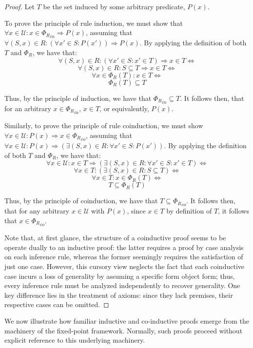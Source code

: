 \begin{proof}
Let $T$ be the set induced by some arbitrary predicate, $P(x)$.

To prove the principle of rule induction, we must show that $\forall x \in \mathcal{U}: x \in {\Phi_R}_{in} \Rightarrow P(x)$, assuming that $\forall (S,x) \in R: (\forall x' \in S: P(x')) \Rightarrow P(x)$. By applying the definition of both $T$ and $\Phi_R$, we have that:
$$ \forall (S,x) \in R: (\forall x' \in S: x' \in T) \Rightarrow x \in T  \iff$$
$$ \forall (S,x) \in R: S \subseteq T \Rightarrow x \in T \iff$$
$$ \forall x \in \Phi_R(T): x \in T \iff$$
$$ \Phi_R(T) \subseteq T$$

Thus, by the principle of induction, we have that ${\Phi_R}_{in} \subseteq T$. It follows then, that for an arbitrary $x \in {\Phi_R}_{in}$, $x \in T$, or equivalently, $P(x)$.

Similarly, to prove the principle of rule coinduction, we must show $\forall x \in \mathcal{U}: P(x) \Rightarrow x \in {\Phi_R}_{co}$, assuming that $\forall x \in \mathcal{U}: P(x) \Rightarrow (\exists (S,x) \in R: \forall x' \in S: P(x'))$. By applying the definition of both $T$ and $\Phi_R$, we have that: 
$$\forall x \in \mathcal{U}: x \in T \Rightarrow (\exists (S,x) \in R: \forall x' \in S: x' \in T) \iff$$
$$\forall x \in T : (\exists (S,x) \in R: S \subseteq T) \iff$$
$$\forall x \in T: x \in \Phi_R(T) \iff$$
$$T \subseteq \Phi_R(T)$$

Thus, by the principle of coinduction, we have that $T \subseteq {\Phi_R}_{co}$. It follows then, that for any arbitrary $x \in \mathcal{U}$ with $P(x)$, since $x \in T$ by definition of $T$, it follows that $x \in {\Phi_R}_{co}$.

Note that, at first glance, the structure of a coinductive proof seems to be operate dually to an inductive proof: the latter requires a proof by case analysis on each inference rule, whereas the former seemingly requires the satisfaction of just one case. However, this cursory view neglects the fact that each coinductive case incurs a loss of generality by assuming a specific form object form; thus, every inference rule must be analyzed independently to recover generality. One key difference lies in the treatment of axioms: since they lack premises, their respective cases can be omitted.

\end{proof}

We now illustrate how familiar inductive and co-inductive proofs emerge from the machinery of the fixed-point framework. Normally, such proofs proceed without explicit reference to this underlying machinery.

